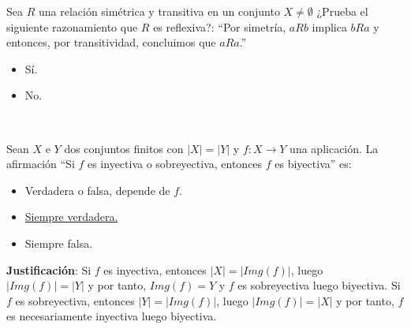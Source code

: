 \documentclass[12pt]{article}
\newcounter{ejercicio}[section] %
\newcounter{ejercicio}
\newcommand{\resetearcontador}{%
  \setcounter{ejercicio}{0} %
}
\begin{document}
    \begin{ejercicio}
        Sea $R$ una relación simétrica y transitiva en un conjunto $X \neq \emptyset$ ¿Prueba el siguiente razonamiento que $R$ es reflexiva?:\newline
        ``Por simetría, $aRb$ implica $bRa$ y entonces, por transitividad, concluimos que $aRa$.''
        \begin{itemize}
            \item Sí.
            \item No.
        \end{itemize}
    \end{ejercicio}

    \newpage
    \ %
    \resetearcontador

    \begin{ejercicio}
        Sean $X$ e $Y$ dos conjuntos finitos con $|X| = |Y|$ y $f:X \rightarrow Y$ una aplicación. La afirmación ``Si $f$ es inyectiva o sobreyectiva, entonces $f$ es biyectiva'' es:
        \begin{itemize}
            \item Verdadera o falsa, depende de $f$.
            \item \underline{Siempre verdadera.}
            \item Siempre falsa.
        \end{itemize}

        \noindent
        \textbf{Justificación}:
        Si $f$ es inyectiva, entonces $|X| = |Img(f)|$, luego $|Img(f)| = |Y|$ y por tanto, $Img(f) = Y$ y $f$ es sobreyectiva luego biyectiva.\newline
        Si $f$ es sobreyectiva, entonces $|Y|=|Img(f)|$, luego $|Img(f)| = |X|$ y por tanto, $f$ es necesariamente inyectiva luego biyectiva.
    \end{ejercicio}
\end{document}

